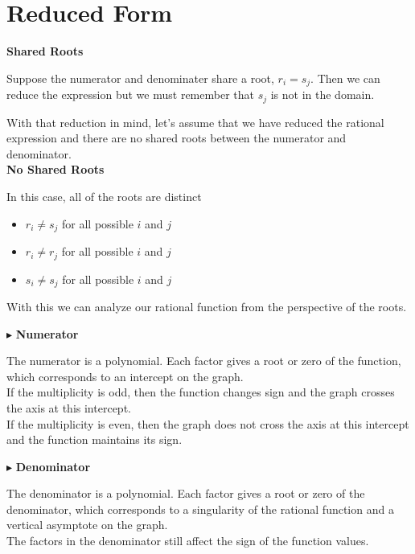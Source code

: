 \documentclass{ximera}
\begin{document}
\section{Reduced Form}

\textbf{Shared Roots}

Suppose the numerator and denominater share a root, $r_i = s_j$.  Then we can reduce the expression but we must remember that $s_j$ is not in the domain.


With that reduction in mind, let's assume that we have reduced the rational expression and there are no shared roots between the numerator and denominator. \\




\textbf{No Shared Roots}

In this case, all of the roots are distinct

\begin{itemize}
\item $r_i \ne s_j$ for all possible $i$ and $j$
\item $r_i \ne r_j$ for all possible $i$ and $j$
\item $s_i \ne s_j$ for all possible $i$ and $j$
\end{itemize}


With this we can analyze our rational function from the perspective of the roots.



$\blacktriangleright$ \textbf{Numerator}



The numerator is a polynomial.  Each factor gives a root or zero of the function, which corresponds to an intercept on the graph. \\

If the multiplicity is odd, then the function changes sign and the graph crosses the axis at this intercept.  \\
If the multiplicity is even, then the graph does not cross the axis at this intercept and the function maintains its sign. 






$\blacktriangleright$ \textbf{Denominator}


The denominator is a polynomial.  Each factor gives a root or zero of the denominator, which corresponds to a singularity of the rational function and a vertical asymptote on the graph. \\


The factors in the denominator still affect the sign of the function values.
\end{document}
